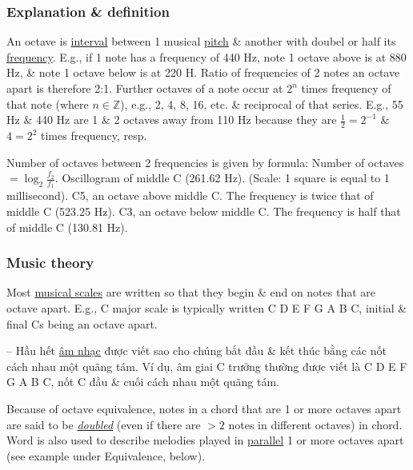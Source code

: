 \documentclass{article}
\begin{document}
\subsubsection{Explanation \& definition}
An octave is \href{https://en.wikipedia.org/wiki/Interval_(music)}{interval} between 1 musical \href{https://en.wikipedia.org/wiki/Pitch_(music)}{pitch} \& another with doubel or half its \href{https://en.wikipedia.org/wiki/Audio_frequency}{frequency}. E.g., if 1 note has a frequency of 440 Hz, note 1 octave above is at 880 Hz, \& note 1 octave below is at 220 H. Ratio of frequencies of 2 notes an octave apart is therefore 2:1. Further octaves of a note occur at $2^n$ times frequency of that note (where $n\in\mathbb{Z}$), e.g., 2, 4, 8, 16, etc. \& reciprocal of that series. E.g., 55 Hz \& 440 Hz are 1 \& 2 octaves away from 110 Hz because they are $\frac{1}{2} = 2^{-1}$ \& $4 = 2^2$ times frequency, resp.

Number of octaves between 2 frequencies is given by formula: Number of octaves $= \log_2\frac{f_2}{f_1}$. {\sf Oscillogram of middle C (261.62 Hz). (Scale: 1 square is equal to 1 millisecond). C5, an octave above middle C. The frequency is twice that of middle C (523.25 Hz). C3, an octave below middle C. The frequency is half that of middle C (130.81 Hz).}

\subsubsection{Music theory}
Most \href{https://en.wikipedia.org/wiki/Scale_(music)}{musical scales} are written so that they begin \& end on notes that are octave apart. E.g., C major scale is typically written C D E F G A B C, initial \& final Cs being an octave apart.

-- Hầu hết \href{https://en.wikipedia.org/wiki/Scale_(music)}{âm nhạc} được viết sao cho chúng bắt đầu \& kết thúc bằng các nốt cách nhau một quãng tám. Ví dụ, âm giai C trưởng thường được viết là C D E F G A B C, nốt C đầu \& cuối cách nhau một quãng tám.

Because of octave equivalence, notes in a chord that are 1 or more octaves apart are said to be \href{https://en.wikipedia.org/wiki/Voicing_(music)#Doubling}{\it doubled} (even if there are $> 2$ notes in different octaves) in chord. Word is also used to describe melodies played in \href{https://en.wikipedia.org/wiki/Contrapuntal_motion#Parallel_motion}{parallel} 1 or more octaves apart (see example under Equivalence, below).
\end{document}
